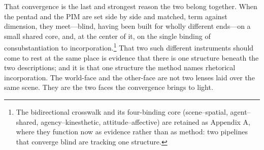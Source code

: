\documentclass{article}
\begin{document}
That convergence is the last and strongest reason the two belong together. When the pentad and the PIM are set side by side and matched, term against dimension, they meet---blind, having been built for wholly different ends---on a small shared core, and, at the center of it, on the single binding of consubstantiation to incorporation.\footnote{The bidirectional crosswalk and its four-binding core (scene--spatial, agent--shared, agency--kinesthetic, attitude--affective) are retained as Appendix A, where they function now as evidence rather than as method: two pipelines that converge blind are tracking one structure.} That two such different instruments should come to rest at the same place is evidence that there is one structure beneath the two descriptions; and it is that one structure the method names rhetorical incorporation. The world-face and the other-face are not two lenses laid over the same scene. They are the two faces the convergence brings to light.

\end{document}
